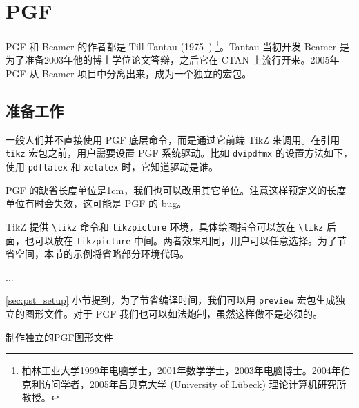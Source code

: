 \chapter{PGF}
\label{sec:pgf}

PGF 和 Beamer 的作者都是 Till Tantau (1975--)\indexTantau{} \footnote{柏林工业大学1999年电脑学士，2001年数学学士，2003年电脑博士。2004年伯克利访问学者，2005年吕贝克大学 (University of Lübeck) 理论计算机研究所教授。}。Tantau 当初开发 Beamer 是为了准备2003年他的博士学位论文答辩，之后它在 CTAN 上流行开来。2005年 PGF 从 Beamer 项目中分离出来，成为一个独立的宏包\citep{Tantau_pgf}。

\section{准备工作}

一般人们并不直接使用 PGF 底层命令，而是通过它前端 TikZ 来调用。在引用 \texttt{tikz} 宏包之前，用户需要设置 PGF 系统驱动。比如 \texttt{dvipdfmx} 的设置方法如下，使用 \texttt{pdflatex} 和 \texttt{xelatex} 时，它知道驱动是谁。

\begin{Code}[]
\def\pgfsysdriver{pgfsys-dvipdfmx.def}
\usepackage{tikz}
\end{Code}

PGF 的缺省长度单位是1cm，我们也可以改用其它单位。注意这样预定义的长度单位有时会失效，这可能是 PGF 的 bug。

\begin{Code}[]
\end{Code}

TikZ 提供 \verb|\tikz| 命令和 \texttt{tikzpicture} 环境，具体绘图指令可以放在 \verb|\tikz| 后面，也可以放在 \texttt{tikzpicture} 中间。两者效果相同，用户可以任意选择。为了节省空间，本节的示例将省略部分环境代码。

\begin{Code}[]
\tikz ...   %
\end{Code}

\ref{sec:pst_setup} 小节提到，为了节省编译时间，我们可以用 \texttt{preview} 宏包生成独立的图形文件。对于 PGF 我们也可以如法炮制，虽然这样做不是必须的。

\begin{example}[htbp]
\caption{制作独立的PGF图形文件}
\label{exa:pgf}
\end{example}

